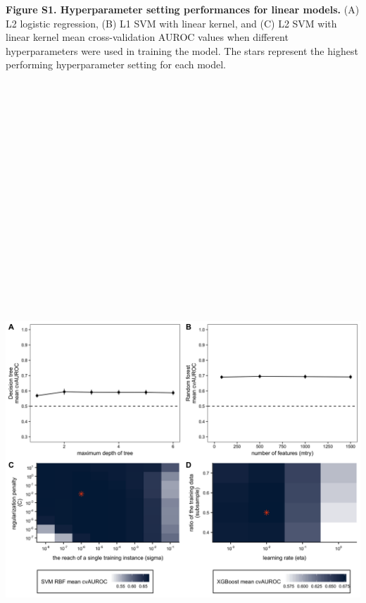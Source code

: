 \documentclass[11pt,]{article}
\begin{document}
\textbf{Figure S1. Hyperparameter setting performances for linear
models.} (A) L2 logistic regression, (B) L1 SVM with linear kernel, and
(C) L2 SVM with linear kernel mean cross-validation AUROC values when
different hyperparameters were used in training the model. The stars
represent the highest performing hyperparameter setting for each model.
\newpage
\includegraphics[height=30cm, width=15cm]{Figure_S2.png}
\end{document}
